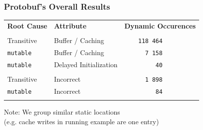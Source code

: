 \documentclass[aspectratio=43]{beamer}
\begin{document}
  \begin{frame}
    \frametitle{Protobuf's Overall Results}
    \large
    \begin{tabular}{b{2.6cm} b{4.2cm} b{2.7cm}}
      \textbf{Root Cause} & \textbf{Attribute}
      & \textbf{Dynamic \newline Occurences} \\
      & & \\
      Transitive       & Buffer / Caching       & \texttt{~~~~118 464} \\
      \texttt{mutable} & Buffer / Caching       & \texttt{~~~~~~7 158} \\
      \texttt{mutable} & Delayed Initialization & \texttt{~~~~~~~~~40} \\
      & & \\
      Transitive       & Incorrect              & \texttt{~~~~~~1 898} \\
      \texttt{mutable} & Incorrect              & \texttt{~~~~~~~~~84} \\
      & & \\
    \end{tabular}

    \vspace{2em}
    \normalsize
    Note: We group similar static locations
    \\(e.g. cache writes in running example are one entry)
  \end{frame}
\end{document}

